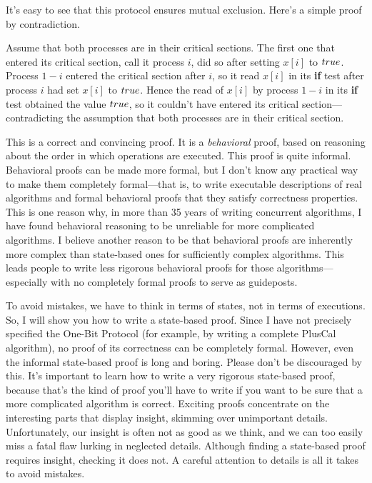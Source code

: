 \documentclass[fleqn,leqno]{article}
\begin{document}
It's easy to see that this protocol ensures mutual exclusion.  Here's
a simple proof by contradiction.  
\begin{display}
Assume that both processes are in their critical sections.  The first
one that entered its critical section, call it process $i$, did so
after setting $x[i]$ to $\TRUE$.  Process $1-i$ entered the critical
section after $i$, so it read $x[i]$ in its \textbf{if} test after
process $i$ had set $x[i]$ to $\TRUE$.  Hence the read of
$x[i]$ by process $1-i$ in its \textbf{if} test obtained the value
$\TRUE$, so it couldn't have entered its critical section---contradicting
the assumption that both processes are in their critical section.
\end{display}
This is a correct and convincing proof.  It is a 
\emph{behavioral}
proof, based on reasoning about the order in which operations are
executed.  This proof is quite informal.  Behavioral proofs can be
made more formal, but I don't know any practical way to make them
completely formal---that is, to write executable descriptions of real
algorithms and formal behavioral proofs that they satisfy correctness
properties.  This is one reason why, in more than 35 years of writing
concurrent algorithms, I have found behavioral reasoning to be
unreliable for more complicated algorithms.  I believe another reason
to be that behavioral proofs are inherently more complex than
state-based ones for sufficiently complex algorithms.  This leads
people to write less rigorous behavioral proofs for those
algorithms---especially with no completely formal proofs to serve as
guideposts.


To avoid mistakes, we have to think in terms of states, not in terms
of executions.  So, I will show you how to write a state-based proof.
Since I have not precisely specified the One-Bit Protocol (for
example, by writing a complete PlusCal algorithm), no proof of its
correctness can be completely formal.  However, even the informal
state-based proof is long and boring.  Please don't be discouraged by
this.  It's important to learn how to write a very rigorous
state-based proof, because that's the kind of proof you'll have to
write if you want to be sure that a more complicated algorithm is
correct.  Exciting proofs concentrate on the interesting parts that
display insight, skimming over unimportant details.  Unfortunately,
our insight is often not as good as we think, and we can too
easily miss a fatal flaw lurking in neglected details.  Although
finding a state-based proof requires insight, checking it does not.  A
careful attention to details is all it takes to avoid mistakes.
\end{document}
